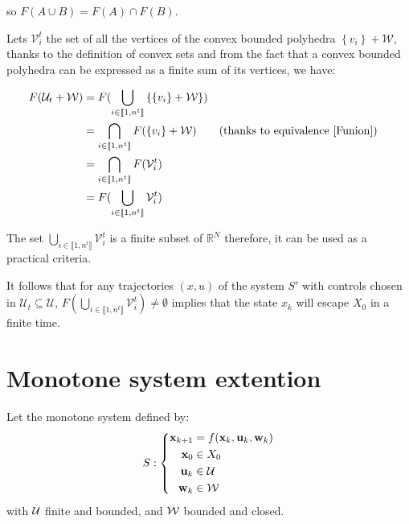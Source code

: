 so $F(A \cup B) = F(A) \cap F(B)$.

Lets $\mathcal{V}^t_i$ the set of all the vertices of the convex bounded polyhedra $\left \{ v_i \right \} + \mathcal{W}$, thanks to the definition of convex sets and from the fact that a convex bounded polyhedra can be expressed as a finite sum of its vertices, we have:

\begin{align*}
F(\mathcal{U}_t + \mathcal{W}) &= F(\bigcup_{i\in \llbracket 1,n^t \rrbracket} \left \{ \left \{ v_i \right \} + \mathcal{W} \right \} ) \\
&= \bigcap_{i\in \llbracket 1,n^t \rrbracket} F(\left \{ v_i \right \} + \mathcal{W}) && \text{(thanks to equivalence \ref{Funion})}\\
&= \bigcap_{i\in \llbracket 1,n^t \rrbracket} F(\mathcal{V}^t_i) \\
&= F( \bigcup_{i\in \llbracket 1,n^t \rrbracket} \mathcal{V}^t_i) \\
\end{align*}

The set $\bigcup_{i\in \llbracket 1,n^t \rrbracket} \mathcal{V}^t_i$ is a finite subset of $\mathbb{R}^N$ therefore, it can be used as a practical criteria.

It follows that for any trajectories $(x,u)$ of the system $S'$ with controls chosen in $\mathcal{U}_t \subseteq \mathcal{U}$, $F( \bigcup_{i\in \llbracket 1,n^t \rrbracket} \mathcal{V}^t_i) \neq \emptyset$ implies that the state $x_k$ will escape $X_0$ in a finite time.

\section{Monotone system extention}
Let the monotone system defined by:
\begin{equation}
S:\left\{
\begin{split}
 \mathbf{x}_{k+1} &= f( \mathbf{x}_k, \mathbf{u}_k, \mathbf{w}_k)\\
 \mathbf{x}_0 &\in X_0\\
 \mathbf{u}_k &\in \mathcal{U}\\
 \mathbf{w}_k &\in \mathcal{W}\\
\end{split}
\right.
\end{equation}
with $\mathcal{U}$ finite and bounded, and $\mathcal{W}$ bounded and closed.

